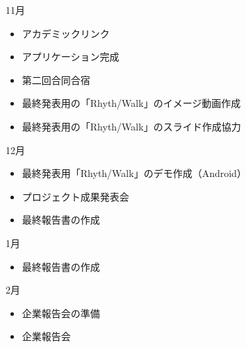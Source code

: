 11月
\begin{itemize}
\item アカデミックリンク
\item アプリケーション完成
\item 第二回合同合宿
\item 最終発表用の「Rhyth/Walk」のイメージ動画作成
\item 最終発表用の「Rhyth/Walk」のスライド作成協力
\end{itemize}
12月
\begin{itemize}
\item 最終発表用「Rhyth/Walk」のデモ作成（Android）
\item プロジェクト成果発表会
\item 最終報告書の作成
\end{itemize}
1月
\begin{itemize}
\item 最終報告書の作成
\end{itemize}
2月
\begin{itemize}
\item 企業報告会の準備
\item 企業報告会
\end{itemize}
